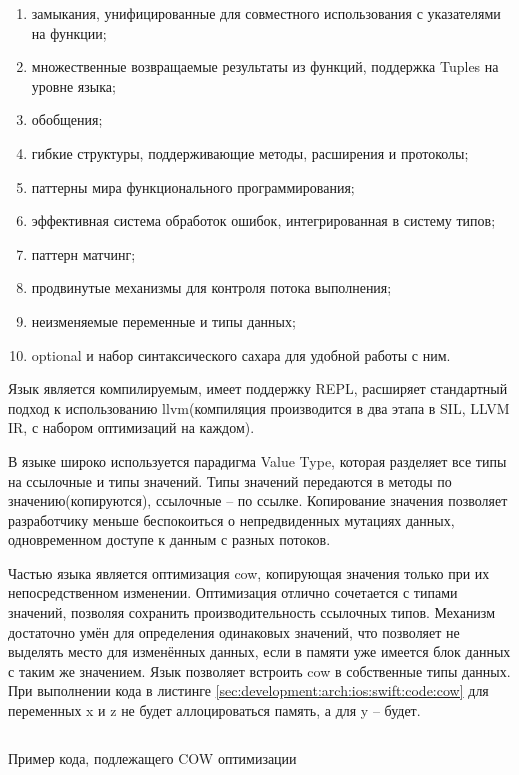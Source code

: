 \begin{enumerate}
	\item замыкания, унифицированные для совместного использования с указателями на функции;
	\item множественные возвращаемые результаты из функций, поддержка Tuples на уровне языка;
	\item обобщения;
	\item гибкие структуры, поддерживающие методы, расширения и протоколы;
	\item паттерны мира функционального программирования;
	\item эффективная система обработок ошибок, интегрированная в систему типов;
	\item паттерн матчинг;
	\item продвинутые механизмы для контроля потока выполнения;
	\item неизменяемые переменные и типы данных;
	\item optional и набор синтаксического сахара для удобной работы с ним.
\end{enumerate}

Язык является компилируемым, имеет поддержку REPL, расширяет стандартный подход к использованию \gls{llvm}(компиляция производится в два этапа в SIL, LLVM IR, с набором оптимизаций на каждом).

В языке широко используется парадигма Value Type, которая разделяет все типы на ссылочные и типы значений. Типы значений передаются в методы по значению(копируются), ссылочные -- по ссылке. Копирование значения позволяет разработчику меньше беспокоиться о непредвиденных мутациях данных, одновременном доступе к данным с разных потоков.

Частью языка является оптимизация \gls{cow}, копирующая значения только при их непосредственном изменении. Оптимизация отлично сочетается с типами значений, позволяя сохранить производительность ссылочных типов. Механизм достаточно умён для определения одинаковых значений, что позволяет не выделять место для изменённых данных, если в памяти уже имеется блок данных с таким же значением. Язык позволяет встроить \gls{cow} в собственные типы данных. При выполнении кода в листинге \ref{sec:development:arch:ios:swift:code:cow} для переменных x и z не будет аллоцироваться память, а для y -- будет.

\begin{code}
	\inputminted{swift}{inc/src/swift_cow_example.swift}
   \caption{Пример кода, подлежащего COW оптимизации}
   \label{sec:development:arch:ios:swift:code:cow}
\end{code}

